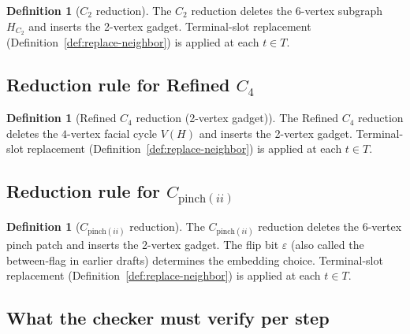 \documentclass[12pt]{article}
\theoremstyle{definition}
\newtheorem{definition}[theorem]{Definition}
\newcommand{\RefinedCFourGadgetVertices}{2}
\newcommand{\CtwoGadgetVertices}{2}
\newcommand{\PinchGadgetVertices}{2}
\newcommand{\CtwoDeletedVertices}{6}
\newcommand{\RefinedCfourDeletedVertices}{4}
\newcommand{\PinchIIDeletedVertices}{6}
\begin{document}
\begin{definition}[$C_2$ reduction]
\label{def:red-c2}
The $C_2$ reduction deletes the $\CtwoDeletedVertices$-vertex subgraph $H_{C_2}$ and inserts the \CtwoGadgetVertices-vertex gadget.
Terminal-slot replacement (Definition~\ref{def:replace-neighbor}) is applied at each $t\in T$.


\end{definition}

\subsection{Reduction rule for \texorpdfstring{Refined $C_4$}{Refined C4}}
\label{subsec:red-c4}

\begin{definition}[Refined $C_4$ reduction (\RefinedCFourGadgetVertices-vertex gadget)]
\label{def:red-c4}
The Refined $C_4$ reduction deletes the $\RefinedCfourDeletedVertices$-vertex facial cycle $V(H)$ and inserts the \RefinedCFourGadgetVertices-vertex gadget.
Terminal-slot replacement (Definition~\ref{def:replace-neighbor}) is applied at each $t\in T$.


\end{definition}

\subsection{Reduction rule for \texorpdfstring{$C_{\mathrm{pinch}(ii)}$}{C_pinch(ii)}}
\label{subsec:red-pinch}

\begin{definition}[$C_{\mathrm{pinch}(ii)}$ reduction]
\label{def:red-pinch}
The $C_{\mathrm{pinch}(ii)}$ reduction deletes the $\PinchIIDeletedVertices$-vertex pinch patch and inserts the \PinchGadgetVertices-vertex gadget.
The flip bit $\varepsilon$ (also called the between-flag in earlier drafts) determines the embedding choice.
Terminal-slot replacement (Definition~\ref{def:replace-neighbor}) is applied at each $t\in T$.


\end{definition}

\subsection{What the checker must verify per step}
\label{subsec:step-checks}
\end{document}
